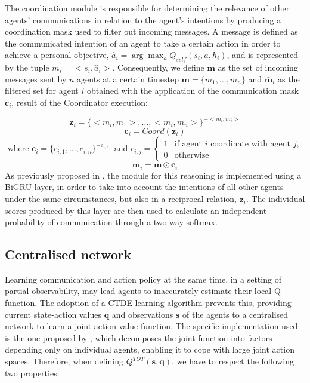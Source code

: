 \documentclass[a4paper,singleside,12pt]{report} %
\begin{document}
The coordination module is responsible for determining the relevance of other agents' communications in relation to the agent's intentions by producing a coordination mask used to filter out incoming messages. A message is defined as the communicated intention of an agent to take a certain action in order to achieve a personal objective, $\hat{a}_i=\arg\max_{a}Q_{self}(s_i,a,h_i)$, and is represented by the tuple \(m_i=<s_i,\hat{a}_i>\). Consequently, we define \(\textbf{m}\) as the set of incoming messages sent by \(n\) agents at a certain timestep \(\textbf{m}=\{m_1,\dots,m_n\}\) and \(\bar{\textbf{m}}_i\) as the filtered set for agent \(i\) obtained with the application of the communication mask \(\textbf{c}_i\), result of the Coordinator execution:

  \begin{equation}
    \textbf{z}_i=\{<m_i,m_1>, \dots ,<m_i,m_n>\}^{-<m_i,m_i>}
  \end{equation}
  \begin{equation}\label{eq:comm-mask}
    \textbf{c}_i=Coord(\textbf{z}_i)
  \end{equation}
  $ \text{ where } \textbf{c}_i=\{c_{i,1},\dots,c_{i,n}\}^{-c_{i,i}}$
  $\text{ and } c_{i,j}= 
    \begin{cases}
        1 & \text{if agent } i \text{ coordinate with agent } j,\\
        0 & \text{otherwise}
    \end{cases}$
  \begin{equation}\label{eq:comm-messages}
    \bar{\textbf{m}}_i=\textbf{m} \odot \textbf{c}_i
  \end{equation}
As previously proposed in \cite{Jiang2018LearningAC}, the module for this reasoning is implemented using a BiGRU layer, in order to take into account the intentions of all other agents under the same circumstances, but also in a reciprocal relation, \(\textbf{z}_i\). The individual scores produced by this layer are then used to calculate an independent probability of communication through a two-way softmax.

\subsection{Centralised network}\label{centralised-network}
Learning communication and action policy at the same time, in a setting of partial observability, may lead agents to inaccurately estimate their local Q function. The adoption of a CTDE learning algorithm prevents this, providing current state-action values $\textbf{q}$ and observations $\textbf{s}$ of the agents to a centralised network to learn a joint action-value function. The specific implementation used is the one proposed by \cite{Rashid2018QMIXMV}, which decomposes the joint function into factors depending only on individual agents, enabling it to cope with large joint action spaces. Therefore, when defining \(Q^{TOT}(\textbf{s}, \textbf{q})\), we have to respect the following two properties:
\end{document}
